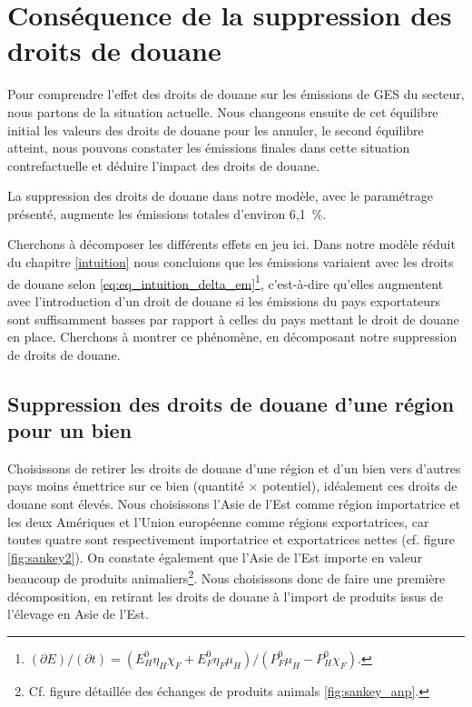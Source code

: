 \section{Conséquence de la suppression des droits de douane}

Pour comprendre l'effet des droits de douane sur les émissions de GES du secteur, nous partons de la situation actuelle. Nous changeons ensuite de cet équilibre initial les valeurs des droits de douane pour les annuler, le second équilibre atteint, nous pouvons constater les émissions finales dans cette situation contrefactuelle et déduire l'impact des droits de douane.

La suppression des droits de douane dans notre modèle, avec le paramétrage présenté, augmente les émissions totales d'environ 6,1~\%.

Cherchons à décomposer les différents effets en jeu ici. Dans notre modèle réduit du chapitre \ref{intuition} nous concluions que les émissions variaient avec les droits de douane selon \ref{eq:eq_intuition_delta_em}\footnote{$\left({\partial E}\right)/\left( {\partial t} \right) = \left( {E_H^0 \eta_H \chi_F + E_F^0 \eta_F \mu_H} \right)/\left( {P_F^0 \mu_H - P_H^0 \chi_F} \right).$}, c'est-à-dire qu'elles augmentent avec l'introduction d'un droit de douane si les émissions du pays exportateurs sont suffisamment basses par rapport à celles du pays mettant le droit de douane en place. Cherchons à montrer ce phénomène, en décomposant notre suppression de droits de douane.

\subsection{Suppression des droits de douane d'une région pour un bien}\label{subsec:ae_anp}

Choisissons de retirer les droits de douane d'une région et d'un bien vers d'autres pays moins émettrice sur ce bien (quantité $\times$ potentiel), idéalement ces droits de douane sont élevés. Nous choisissons l'Asie de l'Est comme région importatrice et les deux Amériques et l'Union européenne comme régions exportatrices, car toutes quatre sont respectivement importatrice et exportatrices nettes (cf. figure \ref{fig:sankey2}). On constate également que l'Asie de l'Est importe en valeur beaucoup de produits animaliers\footnote{Cf. figure détaillée des échanges de produits animals \ref{fig:sankey_anp}.}. Nous choisissons donc de faire une première décomposition, en retirant les droits de douane à l'import de produits issus de l'élevage en Asie de l'Est.

